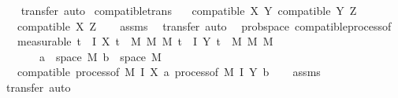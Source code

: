 \begin{isabellebody}
%
\isadelimproof
\ \ %
\endisadelimproof
%
\isatagproof
{}\isamarkupfalse%
\ {\isacharparenleft}{\kern0pt}transfer{\isacharcomma}{\kern0pt}\ auto{\isacharparenright}{\kern0pt}%
\endisatagproof
{\isafoldproof}%
%
\isadelimproof
\isanewline
%
\endisadelimproof
\isanewline
{}\isamarkupfalse%
\ compatible{\isacharunderscore}{\kern0pt}trans{\isacharcolon}{\kern0pt}\isanewline
\ \ \ {\isachardoublequoteopen}compatible\ X\ Y{\isachardoublequoteclose}\ {\isachardoublequoteopen}compatible\ Y\ Z{\isachardoublequoteclose}\isanewline
\ \ \ {\isachardoublequoteopen}compatible\ X\ Z{\isachardoublequoteclose}\isanewline
%
\isadelimproof
\ \ %
\endisadelimproof
%
\isatagproof
{}\isamarkupfalse%
\ assms\ \isamarkupfalse%
\ {\isacharparenleft}{\kern0pt}transfer{\isacharcomma}{\kern0pt}\ auto{\isacharparenright}{\kern0pt}%
\endisatagproof
{\isafoldproof}%
%
\isadelimproof
\isanewline
%
\endisadelimproof
\isanewline
{}\isamarkupfalse%
\ {\isacharparenleft}{\kern0pt}\ prob{\isacharunderscore}{\kern0pt}space{\isacharparenright}{\kern0pt}\ compatible{\isacharunderscore}{\kern0pt}process{\isacharunderscore}{\kern0pt}of{\isacharcolon}{\kern0pt}\isanewline
\ \ \ measurable{\isacharcolon}{\kern0pt}\ {\isachardoublequoteopen}{\isasymforall}t\ {\isasymin}\ I{\isachardot}{\kern0pt}\ X\ t\ {\isasymin}\ M\ {\isasymrightarrow}\isactrlsub M\ M{\isacharprime}{\kern0pt}{\isachardoublequoteclose}\ {\isachardoublequoteopen}{\isasymforall}t\ {\isasymin}\ I{\isachardot}{\kern0pt}\ Y\ t\ {\isasymin}\ M\ {\isasymrightarrow}\isactrlsub M\ M{\isacharprime}{\kern0pt}{\isachardoublequoteclose}\ \isanewline
\ \ \ \ \ \ \ {\isachardoublequoteopen}a\ {\isasymin}\ space\ M{\isacharprime}{\kern0pt}{\isachardoublequoteclose}\ {\isachardoublequoteopen}b\ {\isasymin}\ space\ M{\isacharprime}{\kern0pt}{\isachardoublequoteclose}\isanewline
\ \ \ {\isachardoublequoteopen}compatible\ {\isacharparenleft}{\kern0pt}process{\isacharunderscore}{\kern0pt}of\ M{\isacharprime}{\kern0pt}\ I\ X\ a{\isacharparenright}{\kern0pt}\ {\isacharparenleft}{\kern0pt}process{\isacharunderscore}{\kern0pt}of\ M{\isacharprime}{\kern0pt}\ I\ Y\ b{\isacharparenright}{\kern0pt}{\isachardoublequoteclose}\isanewline
%
\isadelimproof
\ \ %
\endisadelimproof
%
\isatagproof
{}\isamarkupfalse%
\ assms\ \isamarkupfalse%
\ {\isacharparenleft}{\kern0pt}transfer{\isacharcomma}{\kern0pt}\ auto{\isacharparenright}{\kern0pt}%
\endisatagproof

\end{isabellebody}
